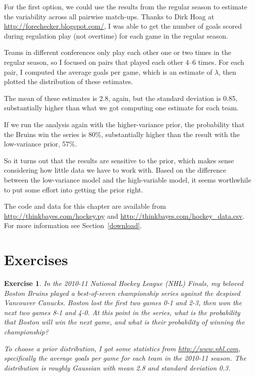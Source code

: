 \documentclass[12pt]{book}
\theoremstyle{exercise}
\newtheorem{exercise}{Exercise}[chapter]
\begin{document}
For the first option, we could use the results from the regular season
to estimate the variability across all pairwise match-ups.  Thanks to
Dirk Hoag at \url{http://forechecker.blogspot.com/}, I was able to get
the number of goals scored during regulation play (not overtime) for
each game in the regular season.

Teams in different conferences only play each other one or two
times in the regular season, so I focused on pairs that played
each other 4--6 times.  For each pair, I computed the average
goals per game, which is an estimate of $\lambda$, then plotted
the distribution of these estimates.

The mean of these estimates is 2.8, again, but the standard
deviation is 0.85, substantially higher than what we got computing
one estimate for each team.

If we run the analysis again with the higher-variance prior, the
probability that the Bruins win the series is 80\%, substantially
higher than the result with the low-variance prior, 57\%.

So it turns out that the results are sensitive to the prior, which
makes sense considering how little data we have to work with.  Based
on the difference between the low-variance model and the high-variable
model, it seems worthwhile to put some effort into getting the prior
right.

The code and data for this chapter are available from
\url{http://thinkbayes.com/hockey.py} and
\url{http://thinkbayes.com/hockey_data.csv}.
  For more information
see Section~\ref{download}.

\section{Exercises}

\begin{exercise}
In the 2010-11 National Hockey League (NHL) Finals, my beloved Boston
Bruins played a best-of-seven championship series against the despised
Vancouver Canucks.  Boston lost the first two games 0-1 and 2-3, then
won the next two games 8-1 and 4-0.  At this point in the series, what
is the probability that Boston will win the next game, and what is
their probability of winning the championship?

To choose a prior distribution, I got some statistics from
\url{http://www.nhl.com}, specifically the average goals per game
for each team in the 2010-11 season.  The distribution is roughly
Gaussian with mean 2.8 and standard deviation 0.3.

\end{exercise}
\end{document}
